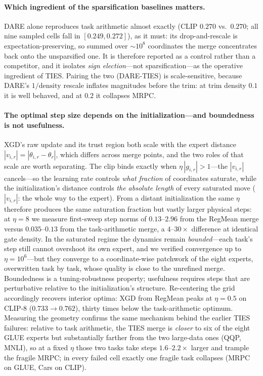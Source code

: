 \documentclass{article} %
\begin{document}
\paragraph{Which ingredient of the sparsification baselines matters.}
DARE alone reproduces task arithmetic almost exactly (CLIP $0.270$ vs.\ $0.270$; all nine sampled cells fall in $[0.249,0.272]$), as it must: its drop-and-rescale is expectation-preserving, so summed over $\sim\!10^8$ coordinates the merge concentrates back onto the unsparsified one. It is therefore reported as a control rather than a competitor, and it isolates \emph{sign election}---not sparsification---as the operative ingredient of TIES. Pairing the two (DARE-TIES) is scale-sensitive, because DARE's $1/\text{density}$ rescale inflates magnitudes before the trim: at trim density $0.1$ it is well behaved, and at $0.2$ it collapses MRPC.

\paragraph{The optimal step size depends on the initialization---and boundedness is not usefulness.}
XGD's raw update and its trust region both scale with the expert distance $|v_{i,r}| = |\theta_{i,r} - \theta_r|$, which differs across merge points, and the two roles of that scale are worth separating. The clip binds exactly when $\eta\,|g_{i,r}| > 1$---the $|v_{i,r}|$ cancels---so the learning rate controls \emph{what fraction} of coordinates saturate, while the initialization's distance controls \emph{the absolute length} of every saturated move ($|v_{i,r}|$: the whole way to the expert). From a distant initialization the same $\eta$ therefore produces the same saturation fraction but vastly larger physical steps: at $\eta=8$ we measure first-sweep step norms of $0.13$--$2.96$ from the RegMean merge versus $0.035$--$0.13$ from the task-arithmetic merge, a $4$--$30\times$ difference at identical gate density. In the saturated regime the dynamics remain \emph{bounded}---each task's step still cannot overshoot its own expert, and we verified convergence up to $\eta=10^6$---but they converge to a coordinate-wise patchwork of the eight experts, overwritten task by task, whose quality is close to the unrefined merge. Boundedness is a tuning-robustness property; usefulness requires steps that are perturbative relative to the initialization's structure. Re-centering the grid accordingly recovers interior optima: XGD from RegMean peaks at $\eta=0.5$ on CLIP-8 ($0.733\to0.762$), thirty times below the task-arithmetic optimum. Measuring the geometry confirms the same mechanism behind the earlier TIES failures: relative to task arithmetic, the TIES merge is \emph{closer} to six of the eight GLUE experts but substantially farther from the two large-data ones (QQP, MNLI), so at a fixed $\eta$ those two tasks take steps $1.6$--$2.2\times$ larger and trample the fragile MRPC; in every failed cell exactly one fragile task collapses (MRPC on GLUE, Cars on CLIP).
\end{document}
